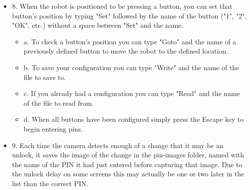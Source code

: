 \documentclass[a4paper,12pt]{letter}
\begin{document}
\begin{itemize}
\begin{itemize}
\end{itemize}
\item 8. When the robot is positioned to be pressing a button, you can set that button's position by typing "Set" followed by the name of the button ("1", "2", "OK", etc.) without a space between "Set" and the name.
\begin{itemize}
\item a. To check a button's position you can type "Goto" and the name of a previously defined button to move the robot to the defined location.
\item b. To save your configuration you can type "Write" and the name of the file to save to.
\item c. If you already had a configuration you can type "Read" and the name of the file to read from.
\item d. When all buttons have been configured simply press the Escape key to begin entering pins.
\end{itemize}
\item 9. Each time the camera detects enough of a change that it may be an unlock, it saves the image of the change in the pin-images folder, named with the name of the PIN it had just entered before capturing that image. Due to the unlock delay on some screens this may actually be one or two later in the list than the correct PIN.
\end{itemize}
\end{document}
